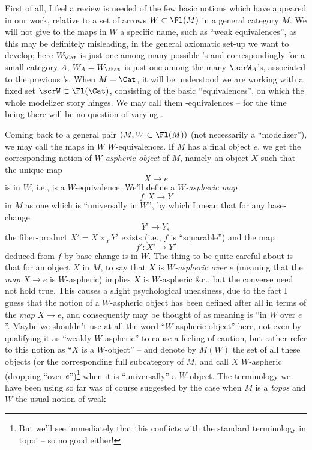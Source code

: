 First of all, I feel a review is needed of the few basic notions which
have appeared in our work, relative to a set of arrows
$W\subset\Fl(M)$ in a general category $M$. We will not give to the
maps in $W$ a specific name, such as ``weak equivalences'', as this
may be definitely misleading, in the general axiomatic set-up we want
to develop; here $W_\Cat$ is just one among many possible \scrW's and
correspondingly for a small category $A$, $W_A=W_\Ahat$ is just one
among the many $\scrW_A$'s, associated to the previous \scrW's. When
$M=\Cat$, it will be understood we are working with a fixed set
$\scrW\subset\Fl(\Cat)$, consisting of the basic ``equivalences'', on
which the whole modelizer story hinges. We may call them
\scrW-equivalences -- for the time being there will be no question of
varying \scrW.

Coming back to a general pair $(M, W\subset\Fl(M))$ (not necessarily a
``modelizer''), we may call the maps in $W$ $W$-equivalences. If $M$
has a final object $e$, we get the corresponding notion of
\emph{$W$-aspheric object} of $M$, namely an object $X$ such that the
unique map
\[ X\to e\]
is in $W$, i.e., is a $W$-equivalence. We'll define a
\emph{$W$-aspheric map}
\[f : X\to Y\]
in $M$ as one which is ``universally in $W$'', by which I mean that
for any base-change
\[ Y' \to Y,\]
the fiber-product $X'=X\times_Y Y'$ exists (i.e., $f$ is
``squarable'') and the map
\[ f': X' \to Y'\]
deduced from $f$ by base change is in $W$. The thing to be quite
careful about is that for an object $X$ in $M$, to say that $X$ is
\emph{$W$-aspheric over $e$} (meaning that the \emph{map} $X\to e$ is
$W$-aspheric) implies $X$ is $W$-aspheric \&c., but the converse need
not hold true. This causes a slight psychological uneasiness, due to
the fact I guess that the notion of a $W$-aspheric object has been
defined after all in terms of the \emph{map} $X\to e$, and
consequently may be thought of as meaning is ``in $W$ over
$e$''. Maybe we shouldn't use at all the word ``$W$-aspheric object''
here, not even by qualifying it as ``weakly $W$-aspheric'' to cause a
feeling of caution, but rather refer to this notion as ``$X$ is a
$W$-object'' -- and denote by $M(W)$ the set of all these objects (or
the corresponding full subcategory of $M$, and call $X$ $W$-aspheric
(dropping ``over $e$'')\footnote{But we'll see immediately that this
  conflicts with the standard terminology in topoi -- so no good
  either!} when it is ``universally'' a $W$-object. The terminology we
have been using so far was of course suggested by the case
when $M$ is a \emph{topos} and $W$ the usual notion of weak
